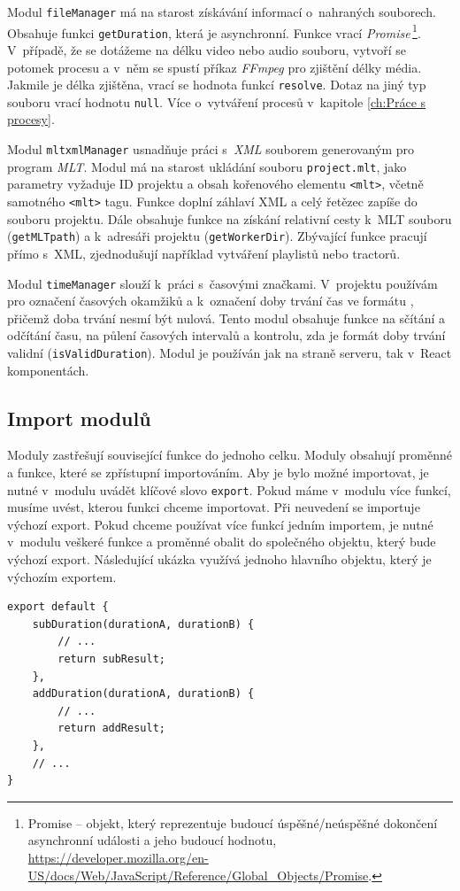 Modul \texttt{fileManager} má na starost získávání informací o~nahraných souborech. Obsahuje funkci \texttt{getDuration}, která je asynchronní. Funkce vrací \textit{Promise}\,\footnote{Promise -- objekt, který reprezentuje budoucí úspěšné/neúspěšné dokončení asynchronní události a jeho budoucí hodnotu, \url{https://developer.mozilla.org/en-US/docs/Web/JavaScript/Reference/Global_Objects/Promise}.}. V~případě, že se dotážeme na délku video nebo audio souboru, vytvoří se potomek procesu a v~něm se spustí příkaz \textit{FFmpeg} pro zjištění délky média. Jakmile je délka zjištěna, vrací se hodnota funkcí \texttt{resolve}. Dotaz na jiný typ souboru vrací hodnotu \texttt{null}. Více o~vytváření procesů v~kapitole \ref{ch:Práce s procesy}.

Modul \texttt{mltxmlManager} usnadňuje práci s~\textit{XML} souborem generovaným pro program \textit{MLT}. Modul má na starost ukládání souboru \texttt{project.mlt}, jako parametry vyžaduje ID projektu a obsah kořenového elementu \texttt{<mlt>}, včetně samotného \texttt{<mlt>} tagu. Funkce doplní záhlaví XML a celý řetězec zapíše do souboru projektu. Dále obsahuje funkce na získání relativní cesty k~MLT souboru (\texttt{getMLTpath}) a k~adresáři projektu (\texttt{getWorkerDir}). Zbývající funkce pracují přímo s~XML, zjednodušují například vytváření playlistů nebo tractorů.

Modul \texttt{timeManager} slouží k~práci s~časovými značkami. V~projektu používám pro označení časových okamžiků a k~označení doby trvání čas ve formátu , přičemž doba trvání nesmí být nulová. Tento modul obsahuje funkce na sčítání a odčítání času, na půlení časových intervalů a kontrolu, zda je formát doby trvání validní (\texttt{isValidDuration}). Modul je používán jak na straně serveru, tak v~React komponentách.

\subsection{Import modulů}
Moduly zastřešují související funkce do jednoho celku. Moduly obsahují proměnné a funkce, které se zpřístupní importováním. Aby je bylo možné importovat, je nutné v~modulu uvádět klíčové slovo \texttt{export}. Pokud máme v~modulu více funkcí, musíme uvést, kterou funkci chceme importovat. Při neuvedení se importuje výchozí export. Pokud chceme používat více funkcí jedním importem, je nutné v~modulu veškeré funkce a proměnné obalit do společného objektu, který bude výchozí export. Následující ukázka využívá jednoho hlavního objektu, který je výchozím exportem.
\begin{lstlisting}[style=JavaScript]
export default {
    subDuration(durationA, durationB) {
        // ...
        return subResult;
    },
    addDuration(durationA, durationB) {
        // ...
        return addResult;
    },
    // ...
}
\end{lstlisting}

